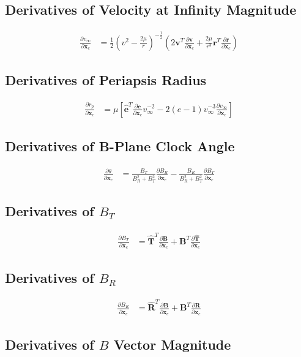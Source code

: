 \documentclass[]{article}
\newcommand{\vb}[1]{\bm{#1}} %
\newcommand{\vbh}[1]{\hat{\bm{#1}}} %
\newcommand{\pd}[2]{\frac{\partial #1}{\partial #2}} %
\newcommand{\xc}[0]{\vb{x}_c}
\begin{document}
\subsection{Derivatives of Velocity at Infinity Magnitude}

\begin{align}
	\pd{v_{\infty}}{\xc} &= \frac{1}{2} \left( v^2 - \frac{2 \mu}{r} \right)^{-\frac{1}{2}} \left( 2 \vb{v}^T \pd{\vb{v}}{\xc} + \frac{2 \mu}{r^3} \vb{r}^T \pd{\vb{r}}{\xc} \right)
\end{align}

\subsection{Derivatives of Periapsis Radius}

\begin{align}
	\pd{r_p}{\xc} &= \mu \left[ \vbh{e}^T \pd{\vb{e}}{\xc} v_{\infty}^{-2} - 2 \left( e - 1 \right) v_{\infty}^{-3} \pd{v_{\infty}}{\xc} \right]
\end{align}

\subsection{Derivatives of B-Plane Clock Angle}

\begin{align}
	\pd{\theta}{\xc} &= \frac{B_T}{B_R^2 + B_T^2} \pd{B_R}{\xc} - \frac{B_R}{B_R^2 + B_T^2} \pd{B_T}{\xc}
\end{align}

\subsection{Derivatives of $B_T$}

\begin{align}
	\pd{B_T}{\xc} &= \vbh{T}^T \pd{\vb{B}}{\xc} + \vb{B}^T \pd{\vbh{T}}{\xc}
\end{align}

\subsection{Derivatives of $B_R$}

\begin{align}
\pd{B_R}{\xc} &= \vbh{R}^T \pd{\vb{B}}{\xc} + \vb{B}^T \pd{\vbh{R}}{\xc}
\end{align}

\subsection{Derivatives of $B$ Vector Magnitude}
\end{document}
